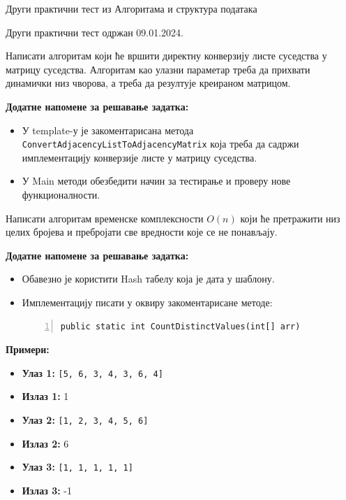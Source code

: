 
Други практични тест из Алгоритама и структура података

Други практични тест одржан 09.01.2024.

Написати алгоритам који ће вршити директну конверзију листе суседства у матрицу суседства. Алгоритам као улазни параметар треба да прихвати динамички низ чворова, а треба да резултује креираном матрицом.

\textbf{Додатне напомене за решавање задатка:}
\begin{itemize}
	\item У template-у је закоментарисана метода \texttt{ConvertAdjacencyListToAdjacencyMatrix} која треба да садржи имплементацију конверзије листе у матрицу суседства.
	\item У Main методи обезбедити начин за тестирање и проверу нове функционалности.
\end{itemize}



Написати алгоритам временске комплексности $O(n)$ који ће претражити низ целих бројева и пребројати све вредности које се не понављају.

\textbf{Додатне напомене за решавање задатка:}
\begin{itemize}
	\item Обавезно је користити Hash табелу која је дата у шаблону.
	\item Имплементацију писати у оквиру закоментарисане методе:
	\begin{Verbatim}[fontsize=\footnotesize, numbers=left, xleftmargin=10mm]
public static int CountDistinctValues(int[] arr)
	\end{Verbatim}
\end{itemize}

\textbf{Примери:}
\begin{itemize}
	\item \textbf{Улаз 1:} \texttt{[5, 6, 3, 4, 3, 6, 4]}
	\item \textbf{Излаз 1:} 1
	\item \textbf{Улаз 2:} \texttt{[1, 2, 3, 4, 5, 6]}
	\item \textbf{Излаз 2:} 6
	\item \textbf{Улаз 3:} \texttt{[1, 1, 1, 1, 1]}
	\item \textbf{Излаз 3:} -1
\end{itemize}



